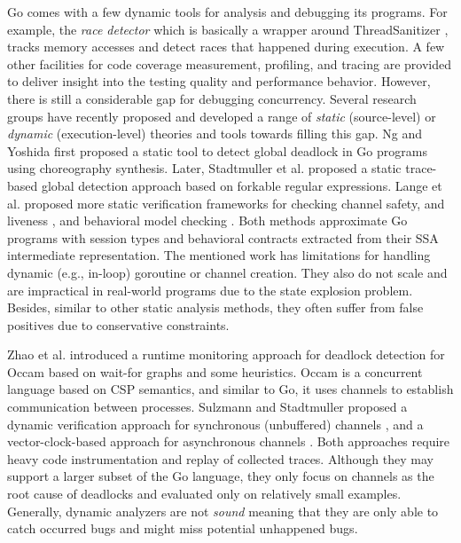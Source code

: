 Go comes with a few dynamic tools for analysis and debugging its programs.
%
For example, the \textit{race detector} \cite{go-race-blog} which is basically a wrapper around ThreadSanitizer \cite{konstantin-tsan-wbia09}, tracks memory accesses and detect races that happened during execution.
%
A few other facilities for code coverage measurement, profiling, and tracing are provided to deliver insight into the testing quality and performance behavior.
%
However, there is still a considerable gap for debugging concurrency.
%
Several research groups have recently proposed and developed a range of \textit{static} (source-level) or \textit{dynamic} (execution-level) theories and tools towards filling this gap.
%
Ng and Yoshida \cite{ng-dl-cc16} first proposed a static tool to detect global deadlock in Go programs using choreography synthesis.
%
Later, Stadtmuller et al. \cite{stadtmuller-minigo-aplas16} proposed a static trace-based global detection approach based on forkable regular expressions.
%
Lange et al. proposed more static verification frameworks for checking channel safety, and liveness \cite{lange-fence-popl17}, and behavioral model checking \cite{lange-staticType-icse18}.
%
Both methods approximate Go programs with session types and behavioral contracts extracted from their SSA intermediate representation.
%
The mentioned work has limitations for handling dynamic (e.g., in-loop) goroutine or channel creation.
%
They also do not scale and are impractical in real-world programs due to the state explosion problem.
%
Besides, similar to other static analysis methods, they often suffer from false positives due to conservative constraints.

%
Zhao et al. \cite{zhao-occam97} introduced a runtime monitoring approach for deadlock detection for Occam based on wait-for graphs and some heuristics. Occam is a concurrent language based on CSP semantics, and similar to Go, it uses channels to establish communication between processes.
%
Sulzmann and Stadtmuller proposed a dynamic verification approach for synchronous (unbuffered) channels \cite{sulzmann-corr17}, and a vector-clock-based approach for asynchronous channels \cite{sulzmann-twophase-2018}.
%
Both approaches require heavy code instrumentation and replay of collected traces.
%
Although they may support a larger subset of the Go language, they only focus on channels as the root cause of deadlocks and evaluated only on relatively small examples.
%
Generally, dynamic analyzers are not \textit{sound} meaning that they are only able to catch occurred bugs and might miss potential unhappened bugs.

